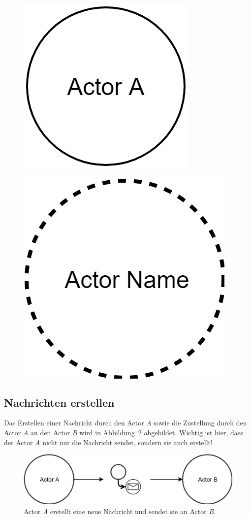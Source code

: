 \begin{figure}
  \centering
  \begin{minipage}{.5\textwidth}
   \centering 
   \includegraphics[width=.5\linewidth]{gfx/actor/longLiveActor}
   \label{fig:actor:diagram:longLiveActor}
  \end{minipage}%
  \begin{minipage}{.5\textwidth}
   \centering
   \includegraphics[width=.5\linewidth]{gfx/actor/shortLiveActor}
   \label{fig:actor:diagram:shortLiveActor}
  \end{minipage}
\end{figure} 

\subsection{Nachrichten erstellen}
Das Erstellen einer Nachricht durch den Actor \textit{A} sowie die Zustellung durch den Actor \textit{A} an den Actor \textit{B} wird in Abbildung~\ref{fig:actor:diagram:simpleCreateAndSendMessage} abgebildet. Wichtig ist hier, dass der Actor \textit{A} nicht nur die Nachricht sendet, sondern sie auch erstellt!
\begin{figure}
  \centering
  \includegraphics[width=\linewidth]{gfx/actor/simpleCreateAndSendMessage}
  \caption{Actor \textit{A} erstellt eine neue Nachricht und sendet sie an Actor \textit{B}.}
  \label{fig:actor:diagram:simpleCreateAndSendMessage}
\end{figure}

